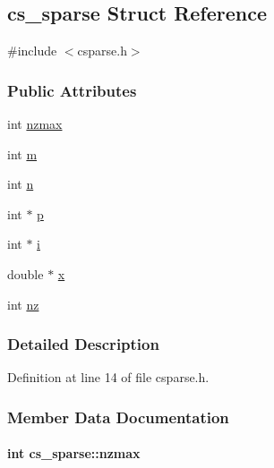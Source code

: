 \hypertarget{structcs__sparse}{\subsection{cs\-\_\-sparse Struct Reference}
\label{structcs__sparse}
}


{\ttfamily \#include $<$csparse.\-h$>$}

\subsubsection*{Public Attributes}
\begin{DoxyCompactItemize}
\item 
int \hyperlink{structcs__sparse_aab49fc365ddf6273376a96d3a6aa751f}{nzmax}
\item 
int \hyperlink{structcs__sparse_a8aeba3ffed4d599a4906e78329d3448b}{m}
\item 
int \hyperlink{structcs__sparse_a86c18870dc1551c71f8ea551efe68625}{n}
\item 
int $\ast$ \hyperlink{structcs__sparse_a263a2347e8dcf1a7a20ee66730297b85}{p}
\item 
int $\ast$ \hyperlink{structcs__sparse_aeb6831b93f8a901b4a5d520c46990f44}{i}
\item 
double $\ast$ \hyperlink{structcs__sparse_a0d6d06e4893a7d4d86e94ce49358d9c1}{x}
\item 
int \hyperlink{structcs__sparse_a707363d7869d3fc4126027c1c9c7cf7c}{nz}
\end{DoxyCompactItemize}


\subsubsection{Detailed Description}


Definition at line 14 of file csparse.\-h.



\subsubsection{Member Data Documentation}
\hypertarget{structcs__sparse_aab49fc365ddf6273376a96d3a6aa751f}{
\paragraph[{nzmax}]{\setlength{\rightskip}{0pt plus 5cm}int cs\-\_\-sparse\-::nzmax}}\label{structcs__sparse_aab49fc365ddf6273376a96d3a6aa751f}


